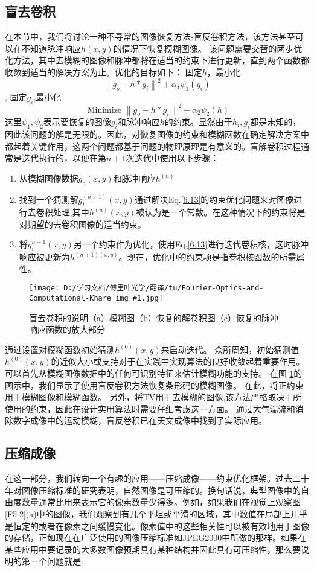 \documentclass[12pt, UTF8]{ctexart}%
\numberwithin{equation}{section}
\numberwithin{figure}{section}
\newcommand {\InsertPic}[3]{\begin{figure}[htbp]\centering \texttt{[image: D:/学习文档/傅里叶光学/翻译/tu/Fourier-Optics-and-Computational-Khare\_img\_\#1.jpg]}\caption{#3}  \label{#2}\end{figure}}%
\newcommand{\InsertEqution}[2]{\begin{equation}
  \label{#1}
   #2
 \end{equation}}
\newcommand{\RefEq}[1]{Eq.\ref{#1}}
\newcommand{\InsertInlineEq}[1]{$#1$}
\newcommand{\RefFig}[1]{图 \ref{#1}}
\newcommand{\InsertItem}[1]{\begin{enumerate} #1 \end{enumerate}}
\begin{document}
\begin{sloppypar}
\subsection{盲去卷积}
在本节中，我们将讨论一种不寻常的图像恢复方法-盲反卷积方法，该方法甚至可以在不知道脉冲响应\InsertInlineEq{h(x,y)}的情况下恢复模糊图像。 该问题需要交替的两步优化方法，其中去模糊的图像和脉冲都将在适当的约束下进行更新，直到两个函数都收敛到适当的解决方案为止。优化的目标如下：
固定\InsertInlineEq{h}，最小化\InsertEqution{6.21}{\left\|g_{o}-h * g_{i}\right\|^{2}+\alpha_{1} \psi_{1}\left(g_{i}\right)},
固定\InsertInlineEq{g_i},最小化\InsertEqution{6.22}{\text { Minimize }\left\|g_{o}-h * g_{i}\right\|^{2}+\alpha_{2} \psi_{2}(h)}
这里\InsertInlineEq{\psi_1,\psi_2}表示要恢复的图像\InsertInlineEq{g_i}和脉冲响应\InsertInlineEq{h}的约束。显然由于\InsertInlineEq{h_i,g_i}都是未知的，因此该问题的解是无限的。因此，对恢复图像的约束和模糊函数在确定解决方案中都起着关键作用，这两个问题都基于问题的物理原理是有意义的。盲解卷积过程通常是迭代执行的，以便在第\InsertInlineEq{n+1}次迭代中使用以下步骤：
\InsertItem{
  \item 从模糊图像数据\InsertInlineEq{g_o(x,y)}和脉冲响应\InsertInlineEq{h^{(n)}}
  \item 找到一个猜测解\InsertInlineEq{g_i^{(n+1)}(x,y)}通过解决\RefEq{6.13}的约束优化问题来对图像进行去卷积处理,其中\InsertInlineEq{h^{(n)}(x,y)}被认为是一个常数。在这种情况下的约束将是对期望的去卷积图像的适当约束。
  \item 将\InsertInlineEq{g_i^{n+1}(x,y)}另一个约束作为优化，使用\RefEq{6.13}进行迭代卷积核，这时脉冲响应被更新为\InsertInlineEq{h^{(n+1)(x,y)}}。现在，优化中的约束项是指卷积核函数的所需属性。
}
\InsertPic{26}{F6.4}{盲去卷积的说明（a）模糊图（b）恢复的解卷积图（c）恢复的脉冲响应函数的放大部分}
通过设置对模糊函数初始猜测\InsertInlineEq{h^{(0)}(x,y)}来启动迭代。 众所周知，初始猜测值\InsertInlineEq{h^{(0)}(x,y)}的近似大小或支持对于在实践中实现算法的良好收敛起着重要作用。可以首先从模糊图像数据中的任何可识别特征来估计模糊功能的支持。 在\RefFig{F6.4}的图示中，我们显示了使用盲反卷积方法恢复条形码的模糊图像。 在此，将正约束用于模糊图像和模糊函数。 另外，将TV用于去模糊的图像,该方法严格取决于所使用的约束，因此在设计实用算法时需要仔细考虑这一方面。 通过大气湍流和消除数字成像中的运动模糊，盲反卷积已在天文成像中找到了实际应用。
\subsection{压缩成像}
在这一部分，我们转向一个有趣的应用——压缩成像——约束优化框架。过去二十年对图像压缩标准的研究表明，自然图像是可压缩的。换句话说，典型图像中的自由度数量通常比用来表示它的像素数量少得多。例如，如果我们在视觉上观察\RefFig{F5.2}(a)中的图像，我们观察到有几个平坦或平滑的区域，其中数值在局部上几乎是恒定的或者在像素之间缓慢变化。像素值中的这些相关性可以被有效地用于图像的存储，正如现在在广泛使用的图像压缩标准如JPEG2000中所做的那样。如果在某些应用中要记录的大多数图像预期具有某种结构并因此具有可压缩性，那么要说明的第一个问题就是:


\end{sloppypar}
\end{document}
